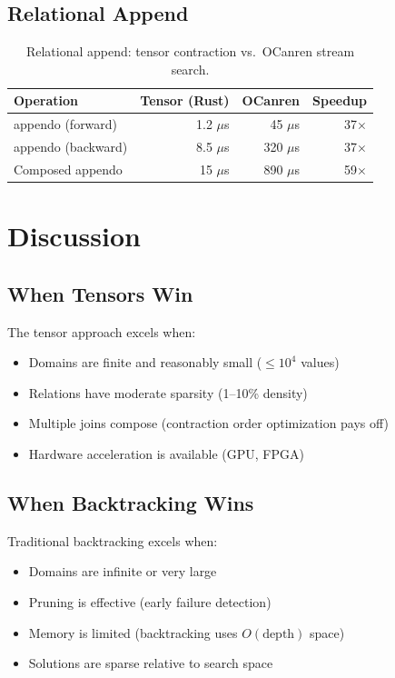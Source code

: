 \documentclass[11pt,a4paper]{article}
\begin{document}
\subsection{Relational Append}

\begin{table}[ht]
\centering
\begin{tabular}{lrrr}
\toprule
\textbf{Operation} & \textbf{Tensor (Rust)} & \textbf{OCanren} & \textbf{Speedup} \\
\midrule
appendo (forward) & 1.2 $\mu$s & 45 $\mu$s & 37$\times$ \\
appendo (backward) & 8.5 $\mu$s & 320 $\mu$s & 37$\times$ \\
Composed appendo & 15 $\mu$s & 890 $\mu$s & 59$\times$ \\
\bottomrule
\end{tabular}
\caption{Relational append: tensor contraction vs.\ OCanren stream search.}
\label{tab:appendo_chirho}
\end{table}

\section{Discussion}
\label{sec:discussion_chirho}

\subsection{When Tensors Win}

The tensor approach excels when:
\begin{itemize}
  \item Domains are finite and reasonably small ($\leq 10^4$ values)
  \item Relations have moderate sparsity (1--10\% density)
  \item Multiple joins compose (contraction order optimization pays off)
  \item Hardware acceleration is available (GPU, FPGA)
\end{itemize}

\subsection{When Backtracking Wins}

Traditional backtracking excels when:
\begin{itemize}
  \item Domains are infinite or very large
  \item Pruning is effective (early failure detection)
  \item Memory is limited (backtracking uses $O(\text{depth})$ space)
  \item Solutions are sparse relative to search space
\end{itemize}
\end{document}
